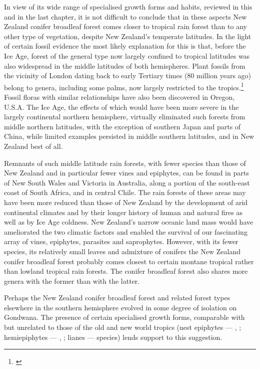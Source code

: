 In view of its wide range of specialised growth forms and habits, reviewed in this and in the last chapter, it is not difficult to conclude that in these aspects New Zealand conifer broadleaf forest comes closer to tropical rain forest than to any other type of vegetation, despite New Zealand's temperate latitudes.
In the light of certain fossil evidence the most likely explanation for this is that, before the Ice Age, forest of the general type now largely confined to tropical latitudes was also widespread in the middle latitudes of both hemispheres.
Plant fossils from the vicinity of London dating back to early Tertiary times (80 million years ago) belong to genera, including some palms, now largely restricted to the tropics.\footnote{\cite{chandler1964lower}}
Fossil floras with similar relationships have also been discovered in Oregon, U.S.A.
The Ice Age, the effects of which would have been more severe in the largely continental northern hemisphere, virtually eliminated such forests from middle northern latitudes, with the exception of southern Japan and parts of China, while limited examples persisted in middle southern latitudes, and in New Zealand best of all.

Remnants of such middle latitude rain forests, with fewer species than those of New Zealand and in particular fewer vines and epiphytes, can be found in parts of New South Wales and Victoria in Australia, along a portion of the south-east coast of South Africa, and in central Chile.
The rain forests of these areas may have been more reduced than those of New Zealand by the development of arid continental climates and by their longer history of human and natural fires as well as by Ice Age coldness.
New Zealand's narrow oceanic land mass would have ameliorated the two climatic factors and enabled the survival of our fascinating array of vines, epiphytes, parasites and saprophytes.
However, with its fewer species, its relatively small leaves and admixture of conifers the New Zealand conifer broadleaf forest probably comes closest to certain montane tropical rather than lowland tropical rain forests.
The conifer broadleaf forest also shares more genera with the former than with the latter.

Perhaps the New Zealand conifer broadleaf forest and related forest types elsewhere in the southern hemisphere evolved in some degree of isolation on Gondwana.
The presence of certain specialised growth forms, comparable with but unrelated to those of the old and new world tropics (nest epiphytes --- , ; hemiepiphytes --- , ; lianes ---  species) lends support to this suggestion.
